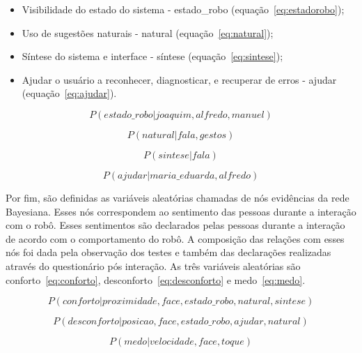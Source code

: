 \begin{itemize}
	\item Visibilidade do estado do sistema - estado\_robo (equação~\ref{eq:estadorobo});
	\item Uso de sugestões naturais - natural (equação~\ref{eq:natural});
	\item Síntese do sistema e interface - síntese (equação~\ref{eq:sintese});
	\item Ajudar o usuário a reconhecer, diagnosticar, e recuperar de erros - ajudar (equação~\ref{eq:ajudar}).
\end{itemize}

\begin{equation}
	\label{eq:estadorobo}
	P(estado\_robo | joaquim, alfredo, manuel)
\end{equation}

\begin{equation}
	\label{eq:natural}
	P(natural | fala, gestos)
\end{equation}

\begin{equation}
	\label{eq:sintese}
	P(sintese | fala)
\end{equation}

\begin{equation}
	\label{eq:ajudar}
	P(ajudar | maria\_eduarda, alfredo)
\end{equation}

Por fim, são definidas as variáveis aleatórias chamadas de nós evidências da rede Bayesiana. Esses nós correspondem ao sentimento das pessoas durante a interação com o robô. Esses sentimentos são declarados pelas pessoas durante a interação de acordo com o comportamento do robô. A composição das relações com esses nós foi dada pela observação dos testes e também das declarações realizadas através do questionário pós interação. As três variáveis aleatórias são conforto~\ref{eq:conforto}, desconforto~\ref{eq:desconforto} e medo~\ref{eq:medo}.

\begin{equation}
	\label{eq:conforto}
	P(conforto | proximidade, face, estado\_robo, natural, sintese)
\end{equation}

\begin{equation}
	\label{eq:desconforto}
	P(desconforto | posicao, face, estado\_robo, ajudar, natural)
\end{equation}

\begin{equation}
	\label{eq:medo}
	P(medo | velocidade, face, toque)
\end{equation}

